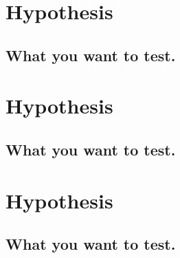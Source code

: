 \documentclass[12 pt]{article}
\begin{document}
\section{Hypothesis}
\subsection*{What you want to test.}

\section{Hypothesis}
\subsection*{What you want to test.}

\section{Hypothesis}
\subsection*{What you want to test.}
\end{document}
